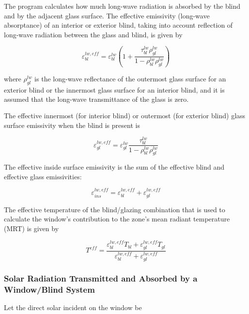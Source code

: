 The program calculates how much long-wave radiation is absorbed by the blind and by the adjacent glass surface. The effective emissivity (long-wave absorptance) of an interior or exterior blind, taking into account reflection of long-wave radiation between the glass and blind, is given by

\begin{equation}
\varepsilon_{bl}^{lw,eff} = \varepsilon_{bl}^{lw}\left( {1 + \frac{{\tau_{bl}^{lw}\rho_{gl}^{lw}}}{{1 - \rho_{bl}^{lw}\rho_{gl}^{lw}}}} \right)
\end{equation}

where \(\rho_{gl}^{lw}\) is the long-wave reflectance of the outermost glass surface for an exterior blind or the innermost glass surface for an interior blind, and it is assumed that the long-wave transmittance of the glass is zero.

The effective innermost (for interior blind) or outermost (for exterior blind) glass surface emissivity when the blind is present is

\begin{equation}
\varepsilon_{gl}^{lw,eff} = \varepsilon_{gl}^{lw}\frac{{\tau_{bl}^{lw}}}{{1 - \rho_{bl}^{lw}\rho_{gl}^{lw}}}
\end{equation}

The effective inside surface emissivity is the sum of the effective blind and effective glass emissivities:

\begin{equation}
\varepsilon_{ins}^{lw,eff} = \varepsilon_{bl}^{lw,eff} + \varepsilon_{gl}^{lw,eff}
\end{equation}

The effective temperature of the blind/glazing combination that is used to calculate the window's contribution to the zone's mean radiant temperature (MRT) is given by

\begin{equation}
T_{}^{eff} = \frac{{\varepsilon_{bl}^{lw,eff}{T_{bl}} + \varepsilon_{gl}^{lw,eff}{T_{gl}}}}{{\varepsilon_{bl}^{lw,eff} + \varepsilon_{gl}^{lw,eff}}}
\end{equation}

\subsubsection{Solar Radiation Transmitted and Absorbed by a Window/Blind System}\label{solar-radiation-transmitted-and-absorbed-by-a-windowblind-system}

Let the direct solar incident on the window be

